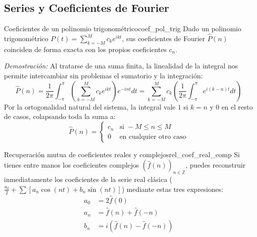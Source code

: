 \subsection{Series y Coeficientes de Fourier}

\begin{proposicion}{Coeficientes de un polinomio trigonométrico}{coef_pol_trig}
Dado un polinomio trigonométrico $P(t) = \sum_{k=-M}^M c_k e^{ikt}$, sus coeficientes de Fourier $\hat{P}(n)$ coinciden de forma exacta con los propios coeficientes $c_n$.

\textit{Demostración:} Al tratarse de una suma finita, la linealidad de la integral nos permite intercambiar sin problemas el sumatorio y la integración:
\begin{equation*}
    \hat{P}(n) = \frac{1}{2\pi} \int_{-\pi}^{\pi} \left( \sum_{k=-M}^M c_k e^{ikt} \right) e^{-int} dt = \sum_{k=-M}^M c_k \left( \frac{1}{2\pi} \int_{-\pi}^{\pi} e^{i(k-n)t} dt \right)
\end{equation*}
Por la ortogonalidad natural del sistema, la integral vale $1$ si $k=n$ y $0$ en el resto de casos, colapsando toda la suma a:
\begin{equation*}
    \hat{P}(n) = \begin{cases} c_n & \text{si } -M \le n \le M \\ 0 & \text{en cualquier otro caso} \end{cases}
\end{equation*}
\end{proposicion}

\begin{observacion}{Recuperación mutua de coeficientes reales y complejos}{rel_coef_real_comp}
Si tienes entre manos los coeficientes complejos $(\hat{f}(n))_{n \in \mathbb{Z}}$, puedes reconstruir inmediatamente los coeficientes de la serie real clásica ($\frac{a_0}{2} + \sum [a_n \cos(nt) + b_n \sin(nt)]$) mediante estas tres expresiones:
\begin{align*}
    a_0 &= 2\hat{f}(0) \\
    a_n &= \hat{f}(n) + \hat{f}(-n) \\
    b_n &= i(\hat{f}(n) - \hat{f}(-n))
\end{align*}
\end{observacion}

